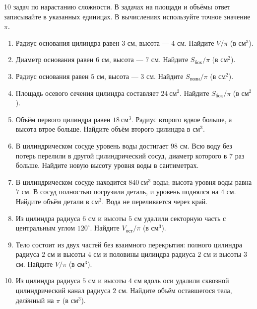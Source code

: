 \documentclass[a4paper,12pt]{article}
\newcommand{\checktitle}[1]{\vspace{0.6em}{\large\color{darkaccent}\bfseries #1}\par\vspace{0.20em}{\color{accent}\rule{\linewidth}{0.52pt}}\vspace{0.20em}}
\begin{document}
\clearpage
\checktitle{Тренировочный блок · Путь А}
\textcolor{muted}{10 задач по нарастанию сложности. В задачах на площади и объёмы ответ записывайте в указанных единицах. В вычислениях используйте точное значение $\pi$.}

\begin{enumerate}[label=\textcolor{darkaccent}{\bfseries\arabic*.},itemsep=10pt]
\item Радиус основания цилиндра равен $3$ см, высота --- $4$ см. Найдите $V/\pi$ (в $\text{см}^3$).
\item Диаметр основания равен $6$ см, высота --- $7$ см. Найдите $S_{\text{бок}}/\pi$ (в $\text{см}^2$).
\item Радиус основания равен $5$ см, высота --- $3$ см. Найдите $S_{\text{полн}}/\pi$ (в $\text{см}^2$).
\item Площадь осевого сечения цилиндра составляет $24\ \text{см}^2$. Найдите $S_{\text{бок}}/\pi$ (в $\text{см}^2$).
\item Объём первого цилиндра равен $18\ \text{см}^3$. Радиус второго вдвое больше, а высота втрое больше. Найдите объём второго цилиндра в $\text{см}^3$.
\item В цилиндрическом сосуде уровень воды достигает $98$ см. Всю воду без потерь перелили в другой цилиндрический сосуд, диаметр которого в $7$ раз больше. Найдите новую высоту уровня воды в сантиметрах.
\item В цилиндрическом сосуде находится $840\ \text{см}^3$ воды; высота уровня воды равна $7$ см. В сосуд полностью погрузили деталь, и уровень поднялся на $4$ см. Найдите объём детали в $\text{см}^3$. Вода не переливается через край.
\item Из цилиндра радиуса $6$ см и высоты $5$ см удалили секторную часть с центральным углом $120^\circ$. Найдите $V_{\text{ост}}/\pi$ (в $\text{см}^3$).
\item Тело состоит из двух частей без взаимного перекрытия: полного цилиндра радиуса $2$ см и высоты $4$ см и половины цилиндра радиуса $2$ см и высоты $3$ см. Найдите $V/\pi$ (в $\text{см}^3$).
\item Из цилиндра радиуса $5$ см и высоты $4$ см вдоль оси удалили сквозной цилиндрический канал радиуса $2$ см. Найдите объём оставшегося тела, делённый на $\pi$ (в $\text{см}^3$).
\end{enumerate}
\end{document}

